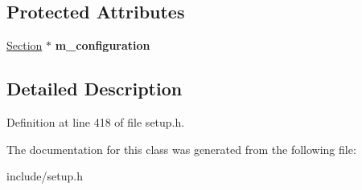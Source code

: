 \subsection*{Protected Attributes}
\begin{DoxyCompactItemize}
\item 
\hypertarget{classModule__base_aceab15faaa79b216f6d417b0c80fdce6}{\hyperlink{classSection}{Section} $\ast$ {\bfseries m\-\_\-configuration}}\label{classModule__base_aceab15faaa79b216f6d417b0c80fdce6}

\end{DoxyCompactItemize}


\subsection{Detailed Description}


Definition at line 418 of file setup.\-h.



The documentation for this class was generated from the following file\-:\begin{DoxyCompactItemize}
\item 
include/setup.\-h\end{DoxyCompactItemize}
